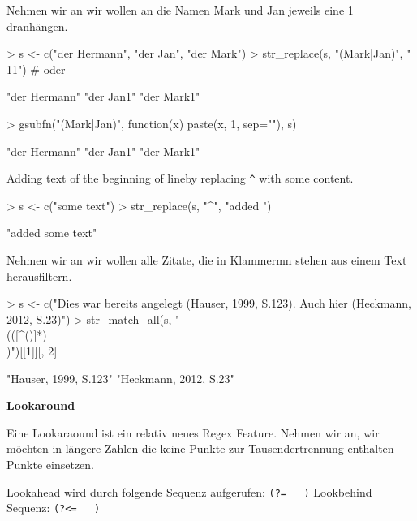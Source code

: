 \documentclass[a4paper]{report}
\begin{document}
Nehmen wir an wir wollen an die Namen Mark und Jan jeweils eine 1 dranhängen.

\begin{Schunk}
\begin{Sinput}
> s <- c("der Hermann", "der Jan", "der Mark")
> str_replace(s, "(Mark|Jan)", "\\11")   # oder
\end{Sinput}
\begin{Soutput}
[1] "der Hermann" "der Jan1"    "der Mark1"  
\end{Soutput}
\begin{Sinput}
> gsubfn("(Mark|Jan)", function(x) paste(x, 1, sep=""), s)
\end{Sinput}
\begin{Soutput}
[1] "der Hermann" "der Jan1"    "der Mark1"  
\end{Soutput}
\end{Schunk}

Adding text of the beginning of lineby replacing \verb!^! with some content.
\begin{Schunk}
\begin{Sinput}
> s <- c("some text")
> str_replace(s, "^", "added ")
\end{Sinput}
\begin{Soutput}
[1] "added some text"
\end{Soutput}
\end{Schunk}

Nehmen wir an wir wollen alle Zitate, die in Klammermn stehen aus einem Text herausfiltern.

\begin{Schunk}
\begin{Sinput}
> s <- c("Dies war bereits angelegt (Hauser, 1999, S.123). Auch hier (Heckmann, 2012, S.23)") 
> str_match_all(s, "\\(([^()]*)\\)")[[1]][, 2]
\end{Sinput}
\begin{Soutput}
[1] "Hauser, 1999, S.123"  "Heckmann, 2012, S.23"
\end{Soutput}
\end{Schunk}

\textbf{Lookaround}

Eine Lookaraound ist ein relativ neues Regex Feature.
Nehmen wir an, wir möchten in längere Zahlen die keine Punkte zur Tausendertrennung enthalten Punkte einsetzen.  

Lookahead wird durch folgende Sequenz aufgerufen: \verb!(?=   )!
Lookbehind Sequenz: \verb!(?<=   )!
\end{document}
